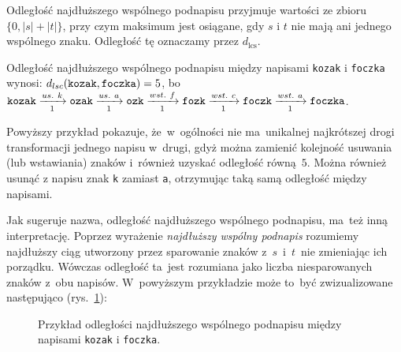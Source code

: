 \documentclass{praca1}
\begin{document}
Odległość najdłuższego wspólnego podnapisu przyjmuje wartości ze zbioru $\{0, |s|+|t|\}$, przy czym maksimum jest osiągane, gdy $s$ i $t$ nie mają ani jednego wspólnego znaku. Odległość tę oznaczamy przez $d_{\mathrm{lcs}}$.

\begin{example}
Odległość najdłuższego wspólnego podnapisu między napisami \verb|kozak| i \verb|foczka| wynosi: $d_{lsc}(\verb|kozak|, \verb|foczka|) = 5$, bo~$\verb|kozak|\xrightarrow[1]{us.\ k} \verb|ozak| \xrightarrow[1]{us.\ a} \verb|ozk| \xrightarrow[1]{wst.\ f} \verb|fozk| \xrightarrow[1]{wst.\ c} \verb|foczk| \xrightarrow[1]{wst.\ a} \verb|foczka|$.
\end{example}

Powyższy przykład pokazuje, że~w~ogólności nie ma~unikalnej najkrótszej drogi transformacji jednego napisu w~drugi, gdyż można zamienić kolejność usuwania (lub wstawiania) znaków i~również uzyskać odległość równą~$5$. Można również usunąć z napisu znak \verb|k| zamiast \verb|a|, otrzymując taką samą odległość między napisami.

Jak sugeruje nazwa, odległość najdłuższego wspólnego podnapisu, ma~też inną interpretację. Poprzez wyrażenie \emph{najdłuższy wspólny podnapis} rozumiemy najdłuższy ciąg utworzony przez sparowanie znaków z~$s$~i~$t$~nie zmieniając ich porządku. Wówczas odległość ta~jest rozumiana jako liczba niesparowanych znaków z~obu napisów. W~powyższym przykładzie może to~być zwizualizowane następująco (rys.~\ref{rys:003}):
	
	

\begin{figure}[width=80pt]
\centering
{}
\cprotect\caption{Przykład odległości najdłuższego wspólnego podnapisu między napisami \verb|kozak| i \verb|foczka|.}\label{rys:003}
\end{figure}
\end{document}
